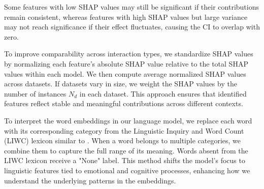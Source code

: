 \documentclass[9pt,a4paper]{rho-class/rho}
\begin{document}
Some features with low SHAP values may still be significant if their contributions remain consistent, whereas features with high SHAP values but large variance may not reach significance if their effect fluctuates, causing the CI to overlap with zero.

To improve comparability across interaction types, we standardize SHAP values by normalizing each feature’s absolute SHAP value relative to the total SHAP values within each model. We then compute average normalized SHAP values across datasets. If datasets vary in size, we weight the SHAP values by the number of instances \( N_d \) in each dataset. This approach ensures that identified features reflect stable and meaningful contributions across different contexts.

To interpret the word embeddings in our language model, we replace each word with its corresponding category from the Linguistic Inquiry and Word Count (LIWC) lexicon similar to \cite{kilic2022incorporating}. When a word belongs to multiple categories, we combine them to capture the full range of its meaning. Words absent from the LIWC lexicon receive a "None" label. This method shifts the model's focus to linguistic features tied to emotional and cognitive processes, enhancing how we understand the underlying patterns in the embeddings.
\end{document}
